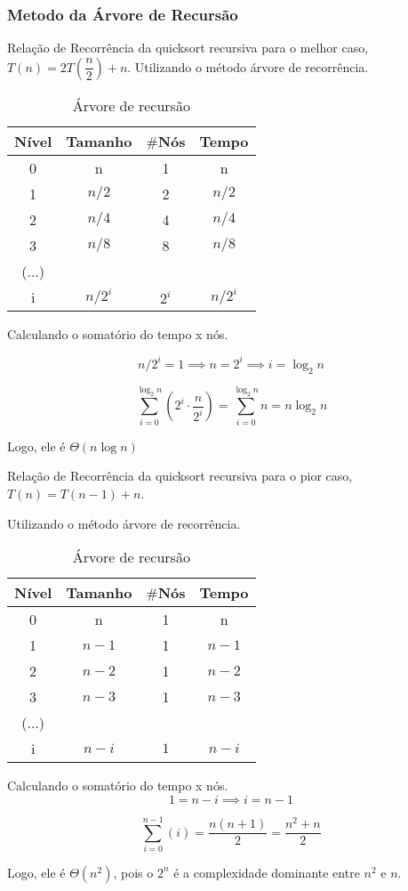 \subsubsection{Metodo da Árvore de Recursão}
Relação de Recorrência da quicksort recursiva para o melhor caso, $T(n) = 2T\left(\dfrac{n}{2}\right) + n$. Utilizando o método árvore de recorrência.

\begin{table}[ht!]
    \centering
    \begin{tabular}{|c|c|c|c|}
    \hline
    \textbf{Nível} & \textbf{Tamanho} & $\#$\textbf{Nós} & \textbf{Tempo} \\ \hline
     0 & n & 1 & n \\ \hline
     1 & $n/2$ & 2 & $n/2$ \\ \hline
     2 & $n/4$ & 4 & $n/4$ \\ \hline
     3 & $n/8$ & 8 & $n/8$ \\ \hline
     (...) & & & \\ \hline
     i & $n/2^i$ & $2^i$ & $n/2^i$ \\ \hline 
    \end{tabular}  
    \caption{Árvore de recursão}
\end{table}

Calculando o somatório do tempo x nós.

\[
n/2^i = 1 \implies n = 2^i \implies i = \log_2{n}
\]

\[
\sum_{i=0}^{\log_2{n}} \left(2^i \cdot \dfrac{n}{2^i}\right) = \sum_{i=0}^{\log_2{n}} n = n \log_2{n}
\]

Logo, ele é $\Theta (n \log{n})$

\bigskip

Relação de Recorrência da quicksort recursiva para o pior caso, $T(n) = T(n - 1) + n$. 

Utilizando o método árvore de recorrência.

\begin{table}[ht!]
    \centering
    \begin{tabular}{|c|c|c|c|}
    \hline
    \textbf{Nível} & \textbf{Tamanho} & $\#$\textbf{Nós} & \textbf{Tempo} \\ \hline
     0 & n & 1 & n \\ \hline
     1 & $n - 1$ & 1 & $n - 1$ \\ \hline
     2 & $n - 2$ & 1 & $n - 2$ \\ \hline
     3 & $n - 3$ & 1 & $n - 3$ \\ \hline
     (...) & & & \\ \hline
     i & $n - i$ & $1$ & $n - i$ \\ \hline 
    \end{tabular}  
    \caption{Árvore de recursão}
\end{table}

Calculando o somatório do tempo x nós. 
\[
1 = n -i \implies i = n - 1
\]

\[
\sum_{i = 0}^{n - 1} \left(i\right) = \frac{n \left(n + 1\right)}{2}= \frac{n^2 + n}{2}
\]

Logo, ele é $\Theta (n^2)$, pois o $2^n$ é a complexidade dominante entre $n^2$ e $n$.